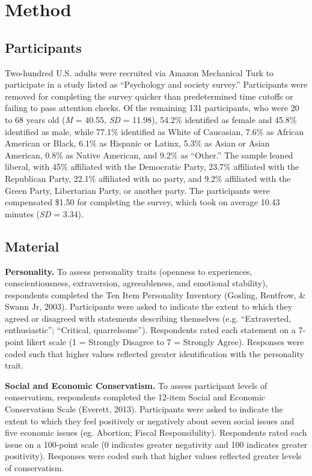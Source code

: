 \documentclass[man]{apa6}
\begin{document}
\section{Method}\label{method}

\subsection{Participants}\label{participants}

Two-hundred U.S. adults were recruited via Amazon Mechanical Turk to
participate in a study listed as \enquote{Psychology and society
survey.} Participants were removed for completing the survey quicker
than predetermined time cutoffs or failing to pass attention checks. Of
the remaining 131 participants, who were 20 to 68 years old (\emph{M} =
40.55, \emph{SD} = 11.98), 54.2\% identified as female and 45.8\%
identified as male, while 77.1\% identified as White of Caucasian, 7.6\%
as African American or Black, 6.1\% as Hispanic or Latinx, 5.3\% as
Asian or Asian American, 0.8\% as Native American, and 9.2\% as
\enquote{Other.} The sample leaned liberal, with 45\% affiliated with
the Democratic Party, 23.7\% affiliated with the Republican Party,
22.1\% affiliated with no party, and 9.2\% affiliated with the Green
Party, Libertarian Party, or another party. The participants were
compensated \$1.50 for completing the survey, which took on average
10.43 minutes (\emph{SD} = 3.34).

\subsection{Material}\label{material}

\textbf{Personality.} To assess personality traits (openness to
experiences, conscientiousness, extraversion, agreeableness, and
emotional stability), respondents completed the Ten Item Personality
Inventory (Gosling, Rentfrow, \& Swann Jr, 2003). Participants were
asked to indicate the extent to which they agreed or disagreed with
statements describing themselves (e.g. \enquote{Extraverted,
enthusiastic}; \enquote{Critical, quarrelsome}). Respondents rated each
statement on a 7-point likert scale (1 = Strongly Disagree to 7 =
Strongly Agree). Responses were coded such that higher values reflected
greater identification with the personality trait.

\textbf{Social and Economic Conservatism.} To assess participant levels
of conservatism, respondents completed the 12-item Social and Economic
Conservatism Scale (Everett, 2013). Participants were asked to indicate
the extent to which they feel positively or negatively about seven
social issues and five economic issues (eg. Abortion; Fiscal
Responsibility). Respondents rated each issue on a 100-point scale (0
indicates greater negativity and 100 indicates greater positivity).
Responses were coded such that higher values reflected greater levels of
conservatism.
\end{document}
